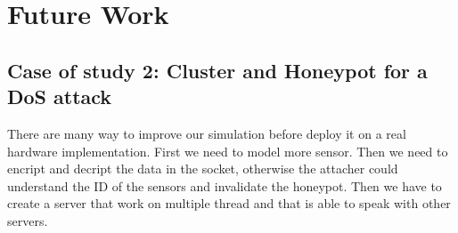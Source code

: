 \section{Future Work}
\subsection{Case of study 2: Cluster and Honeypot for a DoS attack}
There are many way to improve our simulation before deploy it on a real hardware implementation. First we need to model more sensor. Then we need to encript and decript the data in the socket, otherwise the attacher could understand the ID of the sensors and invalidate the honeypot. Then we have to create a server that work on multiple thread and that is able to speak with other servers. 